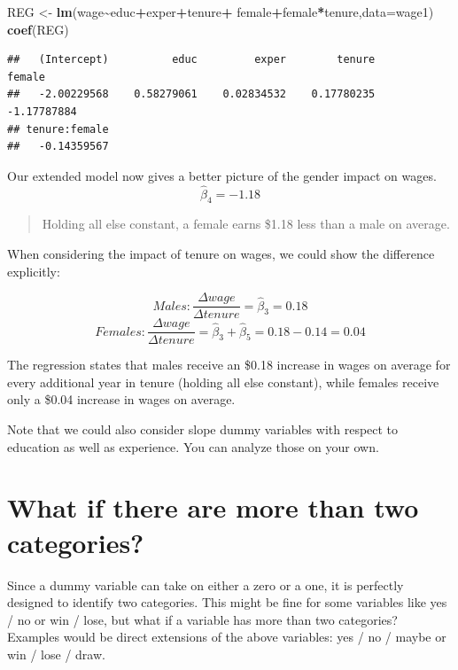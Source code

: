 \documentclass[
]{book}
\newenvironment{Shaded}{\begin{snugshade}}{\end{snugshade}}
\newcommand{\AttributeTok}[1]{\textcolor[rgb]{0.13,0.29,0.53}{#1}}
\newcommand{\FunctionTok}[1]{\textcolor[rgb]{0.13,0.29,0.53}{\textbf{#1}}}
\newcommand{\NormalTok}[1]{#1}
\newcommand{\OtherTok}[1]{\textcolor[rgb]{0.56,0.35,0.01}{#1}}
\newcommand{\SpecialCharTok}[1]{\textcolor[rgb]{0.81,0.36,0.00}{\textbf{#1}}}
\begin{document}
\begin{Shaded}
\begin{Highlighting}[]
\NormalTok{REG }\OtherTok{\textless{}{-}} \FunctionTok{lm}\NormalTok{(wage}\SpecialCharTok{\textasciitilde{}}\NormalTok{educ}\SpecialCharTok{+}\NormalTok{exper}\SpecialCharTok{+}\NormalTok{tenure}\SpecialCharTok{+}
\NormalTok{            female}\SpecialCharTok{+}\NormalTok{female}\SpecialCharTok{*}\NormalTok{tenure,}\AttributeTok{data=}\NormalTok{wage1)}
\FunctionTok{coef}\NormalTok{(REG)}
\end{Highlighting}
\end{Shaded}

\begin{verbatim}
##   (Intercept)          educ         exper        tenure        female 
##   -2.00229568    0.58279061    0.02834532    0.17780235   -1.17787884 
## tenure:female 
##   -0.14359567
\end{verbatim}

Our extended model now gives a better picture of the gender impact on wages.
\[\hat{\beta}_4 = -1.18\]

\begin{quote}
Holding all else constant, a female earns \$1.18 less than a male on average.
\end{quote}

When considering the impact of tenure on wages, we could show the difference explicitly:

\[Males: \frac{\Delta wage}{\Delta tenure} = \hat{\beta}_3=0.18\]
\[Females: \frac{\Delta wage}{\Delta tenure} = \hat{\beta}_3+\hat{\beta}_5=0.18-0.14=0.04\]

The regression states that males receive an \$0.18 increase in wages on average for every additional year in tenure (holding all else constant), while females receive only a \$0.04 increase in wages on average.

Note that we could also consider slope dummy variables with respect to education as well as experience. You can analyze those on your own.

\section{What if there are more than two categories?}\label{what-if-there-are-more-than-two-categories}

Since a dummy variable can take on either a zero or a one, it is perfectly designed to identify two categories. This might be fine for some variables like yes / no or win / lose, but what if a variable has more than two categories? Examples would be direct extensions of the above variables: yes / no / maybe or win / lose / draw.
\end{document}
